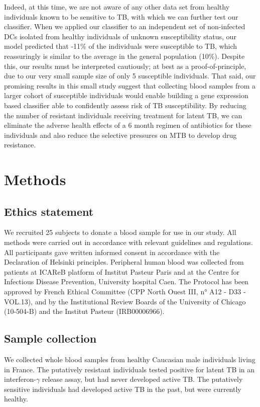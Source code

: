 \documentclass[fleqn,10pt]{wlscirep}
\begin{document}
Indeed, at this time, we are not aware of any other data set from
healthy individuals known to be sensitive to TB, with which we can
further test our classifier. When we applied our classifier to an
independent set of non-infected DCs isolated from healthy individuals
of unknown susceptibility status, our model predicted that
-11\% of the individuals were susceptible to TB, which
reassuringly is similar to the average in the general population
(10\%). Despite this, our results must be interpreted cautiously; at
best as a proof-of-principle, due to our very small sample size of
only 5 susceptible individuals. That said, our promising results in
this small study suggest that collecting blood samples from a larger
cohort of susceptible individuals would enable building a gene
expression based classifier able to confidently assess risk of TB
susceptibility. By reducing the number of resistant individuals
receiving treatment for latent TB, we can eliminate the adverse health
effects of a 6 month regimen of antibiotics for these individuals and
also reduce the selective pressures on MTB to develop drug resistance.
\section*{Methods}

\subsection*{Ethics statement}

We recruited 25 subjects to donate a blood sample for use in our
study. All methods were carried out in accordance with relevant
guidelines and regulations. All participants gave written informed
consent in accordance with the Declaration of Helsinki principles.
Peripheral human blood was collected from patients at ICAReB platform
of Institut Pasteur Paris and at the Centre for Infectious Disease
Prevention, University hospital Caen. The Protocol has been approved
by French Ethical Committee (CPP North Ouest III, n° A12 - D33
-VOL.13), and by the Institutional Review Boards of the University of
Chicago (10-504-B) and the Institut Pasteur (IRB00006966).
\subsection*{Sample collection}

We collected whole blood samples from healthy Caucasian male
individuals living in France. The putatively resistant individuals
tested positive for latent TB in an interferon-$\gamma$ release assay,
but had never developed active TB. The putatively sensitive
individuals had developed active TB in the past, but were currently
healthy.
\end{document}
